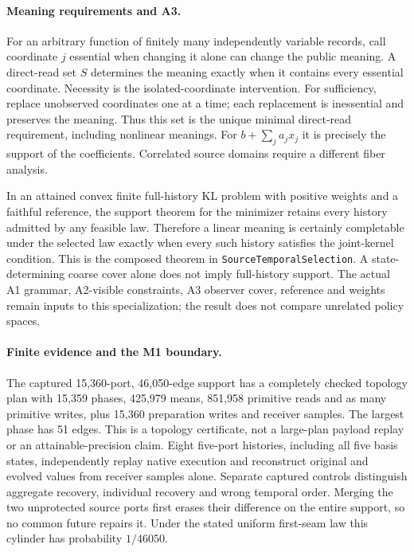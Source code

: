 \paragraph{Meaning requirements and A3.}
For an arbitrary function of finitely many independently variable records,
call coordinate $j$ essential when changing it alone can change the public
meaning. A direct-read set $S$ determines the meaning exactly when it
contains every essential coordinate. Necessity is the isolated-coordinate
intervention. For sufficiency, replace unobserved coordinates one at a time;
each replacement is inessential and preserves the meaning. Thus this set is
the unique minimal direct-read requirement, including nonlinear meanings.
For $b+\sum_j a_jx_j$ it is precisely the support of the coefficients.
Correlated source domains require a different fiber analysis.

In an attained convex finite full-history KL problem with positive weights
and a faithful reference, the support theorem for the minimizer retains
every history admitted by any feasible law. Therefore a linear meaning is
certainly completable under the selected law exactly when every such history
satisfies the joint-kernel condition. This is the composed theorem in
\texttt{SourceTemporalSelection}. A state-determining coarse cover alone
does not imply full-history support. The actual A1 grammar, A2-visible
constraints, A3 observer cover, reference and weights remain inputs to this
specialization; the result does not compare unrelated policy spaces.

\paragraph{Finite evidence and the M1 boundary.}
The captured 15,360-port, 46,050-edge support has a completely checked
topology plan with 15,359 phases, 425,979 means, 851,958 primitive reads and
as many primitive writes, plus 15,360 preparation writes and receiver
samples. The largest phase has 51 edges. This is a topology certificate,
not a large-plan payload replay or an attainable-precision claim. Eight
five-port histories, including all five basis states, independently replay
native execution and reconstruct original and evolved values from receiver
samples alone. Separate captured controls distinguish aggregate recovery,
individual recovery and wrong temporal order. Merging the two unprotected
source ports first erases their difference on the entire support, so no
common future repairs it. Under the stated uniform first-seam law this
cylinder has probability $1/46050$.

